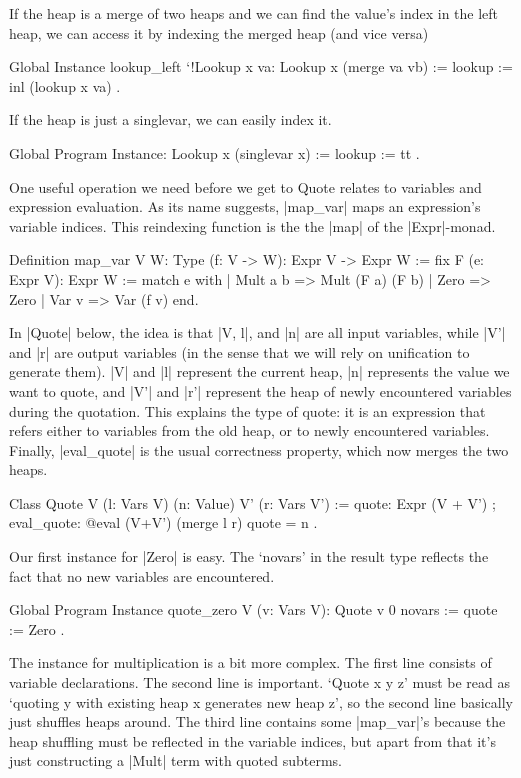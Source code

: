 \documentclass[a4paper,10pt,runningheads]{llncs}
\begin{document}
If the heap is a merge of two heaps and we can find the value's index in the left heap, we can
access it by indexing the merged heap (and vice versa)
\begin{code}
  Global Instance lookup_left `{!Lookup x va}: Lookup x (merge va vb)
    := { lookup := inl (lookup x va) }.
\end{code}
If the heap is just a singlevar, we can easily index it.
\begin{code}
  Global Program Instance: Lookup x (singlevar x) := { lookup := tt }.
\end{code}

One useful operation we need before we get to Quote relates to variables and expression
 evaluation. As its name suggests, |map_var| maps an expression's variable indices.
This reindexing function is the the |map| of the |Expr|-monad.

\begin{code}
Definition map_var {V W: Type} (f: V -> W):
    Expr V -> Expr W :=
  fix F (e: Expr V): Expr W :=
    match e with
    | Mult a b => Mult (F a) (F b)
    | Zero => Zero
    | Var v => Var (f v)
    end.
\end{code}
In |Quote| below, the idea is that |V, l|, and |n| are all input variables, while |V'| and |r| are
output variables (in the sense that we will rely on unification to generate them). |V| and |l|
represent the current heap, |n| represents the value we want to quote, and |V'| and |r'| represent
the heap of newly encountered variables during the quotation.
  This explains the type of quote: it is an expression that refers either to variables from
the old heap, or to newly encountered variables. Finally, |eval_quote| is the usual correctness
property, which now merges the two heaps.

\begin{code}
  Class Quote {V} (l: Vars V) (n: Value) {V'} (r: Vars V') :=
    { quote: Expr (V + V')
    ; eval_quote: @eval (V+V') (merge l r) quote = n }.
\end{code}

Our first instance for |Zero| is easy. The `novars' in the result type reflects the fact that no
new variables are encountered.
\begin{code}
  Global Program Instance quote_zero V (v: Vars V):
    Quote v 0 novars :=
  { quote := Zero }.
\end{code}

The instance for multiplication is a bit more complex. The first line consists of
 variable declarations. The second line is important. `Quote x y z' must be read as
 `quoting y with existing heap x generates new heap z', so the second line basically just
shuffles heaps around.
 The third line contains some |map_var|'s because the heap shuffling must be
reflected in the variable indices, but apart from that it's just constructing a |Mult| term with
quoted subterms.
\end{document}
